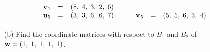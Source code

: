 \begin{exer}
\begin{enumerate}
\begin{displaymath}
\begin{array}{lllllll}
\mathbf{v}_{4} & = & (8, \hspace{1mm} 4, \hspace{1mm} 3, \hspace{1mm} 2, \hspace{1mm} 6) \\ \vspace{1mm} \mathbf{u}_{5} & = & (3, \hspace{1mm} 3, \hspace{1mm} 6, \hspace{1mm} 6, \hspace{1mm} 7) & \hspace{4mm} & \mathbf{v}_{5} & = & (5, \hspace{1mm} 5, \hspace{1mm} 6, \hspace{1mm} 3, \hspace{1mm} 4) \\
\end{array}
\end{displaymath}



\item[(b)] Find the coordinate matrices with respect to $B_{1}$ and $B_{2}$ of $\mathbf{w} = (1, \hspace{1mm} 1, \hspace{1mm} 1, \hspace{1mm} 1, \hspace{1mm} 1)$.

\end{enumerate}

\end{exer}



